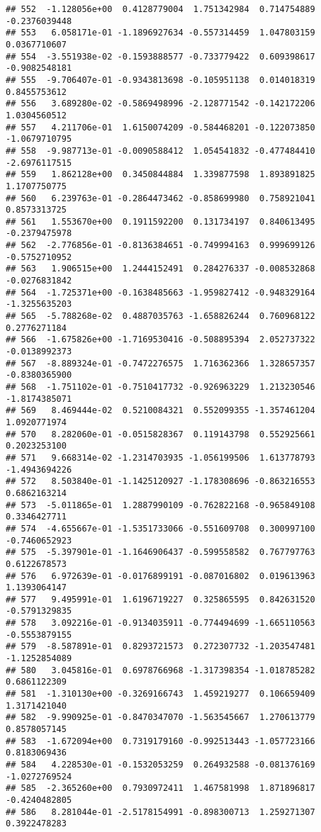 \documentclass[
]{article}
\begin{document}
\begin{verbatim}
## 552  -1.128056e+00  0.4128779004  1.751342984  0.714754889 -0.2376039448
## 553   6.058171e-01 -1.1896927634 -0.557314459  1.047803159  0.0367710607
## 554  -3.551938e-02 -0.1593888577 -0.733779422  0.609398617 -0.9082548181
## 555  -9.706407e-01 -0.9343813698 -0.105951138  0.014018319  0.8455753612
## 556   3.689280e-02 -0.5869498996 -2.128771542 -0.142172206  1.0304560512
## 557   4.211706e-01  1.6150074209 -0.584468201 -0.122073850 -1.0679710795
## 558  -9.987713e-01 -0.0090588412  1.054541832 -0.477484410 -2.6976117515
## 559   1.862128e+00  0.3450844884  1.339877598  1.893891825  1.1707750775
## 560   6.239763e-01 -0.2864473462 -0.858699980  0.758921041  0.8573313725
## 561   1.553670e+00  0.1911592200  0.131734197  0.840613495 -0.2379475978
## 562  -2.776856e-01 -0.8136384651 -0.749994163  0.999699126 -0.5752710952
## 563   1.906515e+00  1.2444152491  0.284276337 -0.008532868 -0.0276831842
## 564  -1.725371e+00 -0.1638485663 -1.959827412 -0.948329164 -1.3255635203
## 565  -5.788268e-02  0.4887035763 -1.658826244  0.760968122  0.2776271184
## 566  -1.675826e+00 -1.7169530416 -0.508895394  2.052737322 -0.0138992373
## 567  -8.889324e-01 -0.7472276575  1.716362366  1.328657357 -0.8380365900
## 568  -1.751102e-01 -0.7510417732 -0.926963229  1.213230546 -1.8174385071
## 569   8.469444e-02  0.5210084321  0.552099355 -1.357461204  1.0920771974
## 570   8.282060e-01 -0.0515828367  0.119143798  0.552925661  0.2023253100
## 571   9.668314e-02 -1.2314703935 -1.056199506  1.613778793 -1.4943694226
## 572   8.503840e-01 -1.1425120927 -1.178308696 -0.863216553  0.6862163214
## 573  -5.011865e-01  1.2887990109 -0.762822168 -0.965849108  0.3346427711
## 574  -4.655667e-01 -1.5351733066 -0.551609708  0.300997100 -0.7460652923
## 575  -5.397901e-01 -1.1646906437 -0.599558582  0.767797763  0.6122678573
## 576   6.972639e-01 -0.0176899191 -0.087016802  0.019613963  1.1393064147
## 577   9.495991e-01  1.6196719227  0.325865595  0.842631520 -0.5791329835
## 578   3.092216e-01 -0.9134035911 -0.774494699 -1.665110563 -0.5553879155
## 579  -8.587891e-01  0.8293721573  0.272307732 -1.203547481 -1.1252854089
## 580   3.045816e-01  0.6978766968 -1.317398354 -1.018785282  0.6861122309
## 581  -1.310130e+00 -0.3269166743  1.459219277  0.106659409  1.3171421040
## 582  -9.990925e-01 -0.8470347070 -1.563545667  1.270613779  0.8578057145
## 583  -1.672094e+00  0.7319179160 -0.992513443 -1.057723166  0.8183069436
## 584   4.228530e-01 -0.1532053259  0.264932588 -0.081376169 -1.0272769524
## 585  -2.365260e+00  0.7930972411  1.467581998  1.871896817 -0.4240482805
## 586   8.281044e-01 -2.5178154991 -0.898300713  1.259271307  0.3922478283

\end{verbatim}
\end{document}
